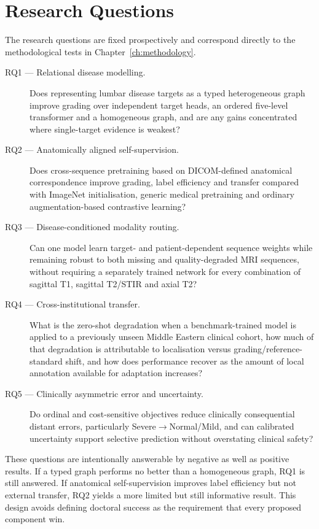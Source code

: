 \section{Research Questions}
\label{sec:intro-rqs}

The research questions are fixed prospectively and correspond directly to the
methodological tests in Chapter~\ref{ch:methodology}.

\begin{description}
  \item[RQ1 --- Relational disease modelling.] Does representing lumbar disease
  targets as a typed heterogeneous graph improve grading over independent target
  heads, an ordered five-level transformer and a homogeneous graph, and are any
  gains concentrated where single-target evidence is weakest?

  \item[RQ2 --- Anatomically aligned self-supervision.] Does cross-sequence
  pretraining based on DICOM-defined anatomical correspondence improve grading,
  label efficiency and transfer compared with ImageNet initialisation, generic
  medical pretraining and ordinary augmentation-based contrastive learning?

  \item[RQ3 --- Disease-conditioned modality routing.] Can one model learn
  target- and patient-dependent sequence weights while remaining robust to both
  missing and quality-degraded MRI sequences, without requiring a separately
  trained network for every combination of sagittal T1, sagittal T2/STIR and axial
  T2?

  \item[RQ4 --- Cross-institutional transfer.] What is the zero-shot degradation
  when a benchmark-trained model is applied to a previously unseen Middle Eastern
  clinical cohort, how much of that degradation is attributable to localisation
  versus grading/reference-standard shift, and how does performance recover as the
  amount of local annotation available for adaptation increases?

  \item[RQ5 --- Clinically asymmetric error and uncertainty.] Do ordinal and
  cost-sensitive objectives reduce clinically consequential distant errors,
  particularly Severe$\rightarrow$Normal/Mild, and can calibrated uncertainty
  support selective prediction without overstating clinical safety?
\end{description}

These questions are intentionally answerable by negative as well as positive
results. If a typed graph performs no better than a homogeneous graph, RQ1 is still
answered. If anatomical self-supervision improves label efficiency but not external
transfer, RQ2 yields a more limited but still informative result. This design avoids
defining doctoral success as the requirement that every proposed component win.

